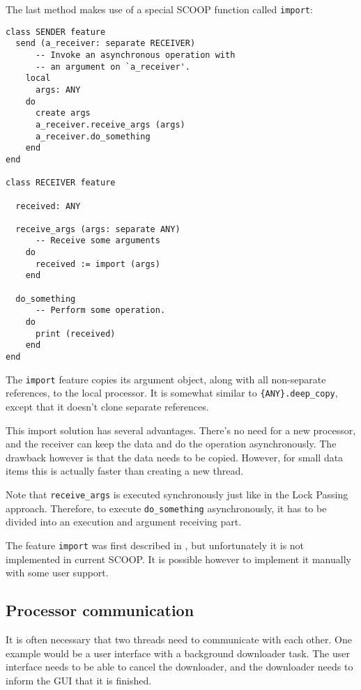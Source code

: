 \documentclass[a4paper,10pt]{article}
\begin{document}
The last method makes use of a special SCOOP function called \lstinline!import!:
\begin{lstlisting}
class SENDER feature
  send (a_receiver: separate RECEIVER)
      -- Invoke an asynchronous operation with
      -- an argument on `a_receiver'.
    local
      args: ANY
    do
      create args
      a_receiver.receive_args (args)
      a_receiver.do_something
    end
end

class RECEIVER feature
  
  received: ANY
  
  receive_args (args: separate ANY)
      -- Receive some arguments
    do
      received := import (args)
    end

  do_something
      -- Perform some operation.
    do
      print (received)
    end
end
\end{lstlisting}
The \lstinline!import! feature copies its argument object, along with all non-separate references, to the local processor.
It is somewhat similar to \lstinline!{ANY}.deep_copy!, except that it doesn't clone separate references.

This import solution has several advantages.
There's no need for a new processor, and the receiver can keep the data and do the operation asynchronously.
The drawback however is that the data needs to be copied.
However, for small data items this is actually faster than creating a new thread.

Note that \lstinline!receive_args! is executed synchronously just like in the Lock Passing approach.
Therefore, to execute \lstinline!do_something! asynchronously, it has to be divided into an execution and argument receiving part.

The feature \lstinline!import! was first described in \cite[p. 106]{Nienaltowski07}, but unfortunately it is not implemented in current SCOOP.
It is possible however to implement it manually with some user support.

\subsection{Processor communication}
\label{sec:processor-communication}


It is often necessary that two threads need to communicate with each other.
One example would be a user interface with a background downloader task.
The user interface needs to be able to cancel the downloader, and the downloader needs to inform the GUI that it is finished.
\end{document}
